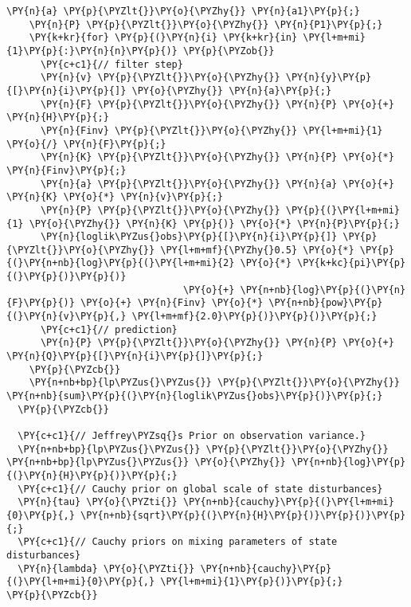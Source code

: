 \begin{Verbatim}[commandchars=\\\{\}]
    \PY{n}{a} \PY{p}{\PYZlt{}}\PY{o}{\PYZhy{}} \PY{n}{a1}\PY{p}{;}
    \PY{n}{P} \PY{p}{\PYZlt{}}\PY{o}{\PYZhy{}} \PY{n}{P1}\PY{p}{;}
    \PY{k+kr}{for} \PY{p}{(}\PY{n}{i} \PY{k+kr}{in} \PY{l+m+mi}{1}\PY{p}{:}\PY{n}{n}\PY{p}{)} \PY{p}{\PYZob{}}
      \PY{c+c1}{// filter step}
      \PY{n}{v} \PY{p}{\PYZlt{}}\PY{o}{\PYZhy{}} \PY{n}{y}\PY{p}{[}\PY{n}{i}\PY{p}{]} \PY{o}{\PYZhy{}} \PY{n}{a}\PY{p}{;}
      \PY{n}{F} \PY{p}{\PYZlt{}}\PY{o}{\PYZhy{}} \PY{n}{P} \PY{o}{+} \PY{n}{H}\PY{p}{;}
      \PY{n}{Finv} \PY{p}{\PYZlt{}}\PY{o}{\PYZhy{}} \PY{l+m+mi}{1} \PY{o}{/} \PY{n}{F}\PY{p}{;}
      \PY{n}{K} \PY{p}{\PYZlt{}}\PY{o}{\PYZhy{}} \PY{n}{P} \PY{o}{*} \PY{n}{Finv}\PY{p}{;}
      \PY{n}{a} \PY{p}{\PYZlt{}}\PY{o}{\PYZhy{}} \PY{n}{a} \PY{o}{+} \PY{n}{K} \PY{o}{*} \PY{n}{v}\PY{p}{;}
      \PY{n}{P} \PY{p}{\PYZlt{}}\PY{o}{\PYZhy{}} \PY{p}{(}\PY{l+m+mi}{1} \PY{o}{\PYZhy{}} \PY{n}{K} \PY{p}{)} \PY{o}{*} \PY{n}{P}\PY{p}{;}
      \PY{n}{loglik\PYZus{}obs}\PY{p}{[}\PY{n}{i}\PY{p}{]} \PY{p}{\PYZlt{}}\PY{o}{\PYZhy{}} \PY{l+m+mf}{\PYZhy{}0.5} \PY{o}{*} \PY{p}{(}\PY{n+nb}{log}\PY{p}{(}\PY{l+m+mi}{2} \PY{o}{*} \PY{k+kc}{pi}\PY{p}{(}\PY{p}{)}\PY{p}{)} 
                               \PY{o}{+} \PY{n+nb}{log}\PY{p}{(}\PY{n}{F}\PY{p}{)} \PY{o}{+} \PY{n}{Finv} \PY{o}{*} \PY{n+nb}{pow}\PY{p}{(}\PY{n}{v}\PY{p}{,} \PY{l+m+mf}{2.0}\PY{p}{)}\PY{p}{)}\PY{p}{;}
      \PY{c+c1}{// prediction}
      \PY{n}{P} \PY{p}{\PYZlt{}}\PY{o}{\PYZhy{}} \PY{n}{P} \PY{o}{+} \PY{n}{Q}\PY{p}{[}\PY{n}{i}\PY{p}{]}\PY{p}{;}
    \PY{p}{\PYZcb{}}
    \PY{n+nb+bp}{lp\PYZus{}\PYZus{}} \PY{p}{\PYZlt{}}\PY{o}{\PYZhy{}} \PY{n+nb}{sum}\PY{p}{(}\PY{n}{loglik\PYZus{}obs}\PY{p}{)}\PY{p}{;}
  \PY{p}{\PYZcb{}}

  \PY{c+c1}{// Jeffrey\PYZsq{}s Prior on observation variance.}
  \PY{n+nb+bp}{lp\PYZus{}\PYZus{}} \PY{p}{\PYZlt{}}\PY{o}{\PYZhy{}} \PY{n+nb+bp}{lp\PYZus{}\PYZus{}} \PY{o}{\PYZhy{}} \PY{n+nb}{log}\PY{p}{(}\PY{n}{H}\PY{p}{)}\PY{p}{;}
  \PY{c+c1}{// Cauchy prior on global scale of state disturbances}
  \PY{n}{tau} \PY{o}{\PYZti{}} \PY{n+nb}{cauchy}\PY{p}{(}\PY{l+m+mi}{0}\PY{p}{,} \PY{n+nb}{sqrt}\PY{p}{(}\PY{n}{H}\PY{p}{)}\PY{p}{)}\PY{p}{;}
  \PY{c+c1}{// Cauchy priors on mixing parameters of state disturbances}
  \PY{n}{lambda} \PY{o}{\PYZti{}} \PY{n+nb}{cauchy}\PY{p}{(}\PY{l+m+mi}{0}\PY{p}{,} \PY{l+m+mi}{1}\PY{p}{)}\PY{p}{;}
\PY{p}{\PYZcb{}}
\end{Verbatim}
